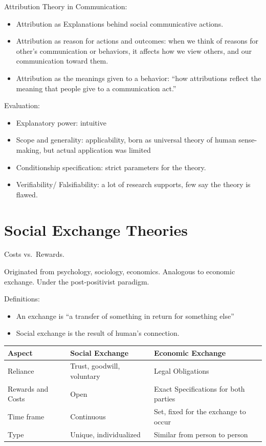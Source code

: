\documentclass[
]{book}
\providecommand{\tightlist}{%
  \setlength{\itemsep}{0pt}\setlength{\parskip}{0pt}}
\begin{document}
Attribution Theory in Communication:

\begin{itemize}
\tightlist
\item
  Attribution as Explanations behind social communicative actions.
\item
  Attribution as reason for actions and outcomes: when we think of reasons for other's communication or behaviors, it
  affects how we view others, and our communication toward them.
\item
  Attribution as the meanings given to a behavior: ``how attributions reflect the meaning that people give to a
  communication act.''
\end{itemize}

Evaluation:

\begin{itemize}
\tightlist
\item
  Explanatory power: intuitive
\item
  Scope and generality: applicability, born as universal theory of human sense-making, but actual application was
  limited
\item
  Conditionship specification: strict parameters for the theory.
\item
  Verifiability/ Falsifiability: a lot of research supports, few say the theory is flawed.
\end{itemize}

\hypertarget{social-exchange-theories}{%
\section{Social Exchange Theories}\label{social-exchange-theories}}

Costs vs.~Rewards.

Originated from psychology, sociology, economics. Analogous to economic exchange. Under the post-positivist paradigm.

Definitions:

\begin{itemize}
\tightlist
\item
  An exchange is ``a transfer of something in return for something else'' \citep{Leffler_1982}\\
\item
  Social exchange is the result of human's connection.
\end{itemize}

\begin{longtable}[]{@{}lll@{}}
\toprule
Aspect & Social Exchange & Economic Exchange\tabularnewline
\midrule
\endhead
Reliance & Trust, goodwill, voluntary & Legal Obligations\tabularnewline
Rewards and Costs & Open & Exact Specifications for both parties\tabularnewline
Time frame & Continuous & Set, fixed for the exchange to occur\tabularnewline
Type & Unique, individualized & Similar from person to person\tabularnewline
\bottomrule
\end{longtable}
\end{document}
